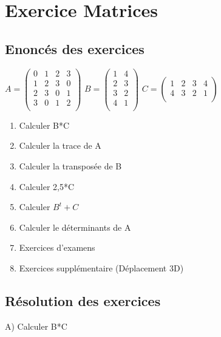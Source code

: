 
\newpage
\section{Exercice Matrices}
\vspace{10mm} %
\subsection{Enoncés des exercices}
\vspace{5mm} %

$
A =
\begin{pmatrix}
  0 & 1 & 2 & 3 \\
  1 & 2 & 3 & 0 \\
  2 & 3 & 0 & 1 \\
  3 & 0 & 1 & 2 \\
\end{pmatrix}
$
\vspace{5mm} %
$
B =
\begin{pmatrix}
  1 & 4 \\
  2 & 3 \\
  3 & 2 \\
  4 & 1 \\
\end{pmatrix}
$
\vspace{5mm} %
$
C =
\begin{pmatrix}
  1 & 2 & 3 & 4 \\
  4 & 3 & 2 & 1 \\
\end{pmatrix}
$
\vspace{3mm} %

\begin{enumerate}[label=\Alph*)]
\item Calculer B*C
\item Calculer la trace de A
\item Calculer la transposée de B
\item Calculer 2,5*C
\item Calculer $B^{t}+C$
\item Calculer le déterminants de A
\item Exercices d'examens
\item Exercices supplémentaire (Déplacement 3D)
\end{enumerate}

\newpage

\subsection{Résolution des exercices}
\vspace{5mm} %
A) Calculer B*C
\vspace{10mm} %

